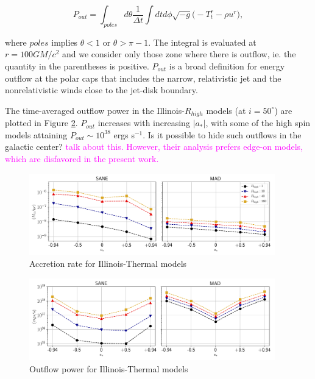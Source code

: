 \begin{equation}
    P_{out} = \int_{poles}d\theta\frac{1}{\Delta t}\int dtd\phi\sqrt{-g}\big(-T^{r}_{t}-\rho u^{r}\big),
\end{equation}

where $poles$ implies $\theta<1$ or $\theta>\pi-1$. The integral is evaluated at $r=100GM/c^{2}$ and we consider only those zone where there is outflow, ie. the quantity in the parentheses is positive. $P_{out}$ is a broad definition for energy outflow at the polar caps that includes the narrow, relativistic jet and the nonrelativistic winds close to the jet-disk boundary.

The time-averaged outflow power in the Illinois-$R_{high}$ models (at $i=50^{\circ}$) are plotted in Figure \ref{fig:outflow_illinois_thermal}. $P_{out}$ increases with increasing $|a_{*}|$, with some of the high spin models attaining $P_{out}\sim 10^{38}$ ergs s$^{-1}$. Is it possible to hide such outflows in the galactic center? \textcolor{magenta}{\citet{2007MNRAS.379.1519M} talk about this. However, their analysis prefers edge-on models, which are disfavored in the present work.}

\begin{figure}
\centering
\includegraphics[width=0.95\textwidth]{figures/illinoisv3_average_mdot.png}
\caption{Accretion rate for Illinois-Thermal models}
\label{fig:accretion_illinois_thermal}
\end{figure}

\begin{figure}
\centering
\includegraphics[width=0.95\textwidth]{figures/illinoisv3_average_outflow_power.png}
\caption{Outflow power for Illinois-Thermal models}
\label{fig:outflow_illinois_thermal}
\end{figure}


